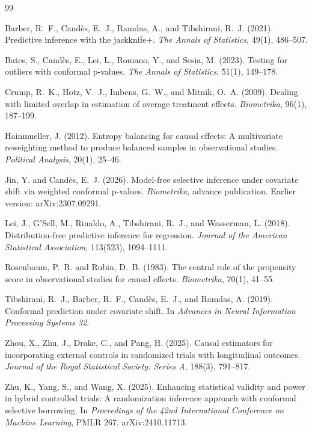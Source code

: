 \documentclass[11pt]{article}
\begin{document}
\newpage

\begin{thebibliography}{99}

Barber, R.~F., Cand\`es, E.~J., Ramdas, A., and Tibshirani, R.~J. (2021).
Predictive inference with the jackknife+.
\emph{The Annals of Statistics}, 49(1), 486--507.

Bates, S., Cand\`es, E., Lei, L., Romano, Y., and Sesia, M. (2023).
Testing for outliers with conformal p-values.
\emph{The Annals of Statistics}, 51(1), 149--178.

Crump, R.~K., Hotz, V.~J., Imbens, G.~W., and Mitnik, O.~A. (2009).
Dealing with limited overlap in estimation of average treatment effects.
\emph{Biometrika}, 96(1), 187--199.

Hainmueller, J. (2012).
Entropy balancing for causal effects: A multivariate reweighting method to produce balanced samples in observational studies.
\emph{Political Analysis}, 20(1), 25--46.

Jin, Y. and Cand\`es, E.~J. (2026).
Model-free selective inference under covariate shift via weighted conformal p-values.
\emph{Biometrika}, advance publication. Earlier version: arXiv:2307.09291.

Lei, J., G'Sell, M., Rinaldo, A., Tibshirani, R.~J., and Wasserman, L. (2018).
Distribution-free predictive inference for regression.
\emph{Journal of the American Statistical Association}, 113(523), 1094--1111.

Rosenbaum, P.~R. and Rubin, D.~B. (1983).
The central role of the propensity score in observational studies for causal effects.
\emph{Biometrika}, 70(1), 41--55.

Tibshirani, R.~J., Barber, R.~F., Cand\`es, E.~J., and Ramdas, A. (2019).
Conformal prediction under covariate shift.
In \emph{Advances in Neural Information Processing Systems 32}.

Zhou, X., Zhu, J., Drake, C., and Pang, H. (2025).
Causal estimators for incorporating external controls in randomized trials with longitudinal outcomes.
\emph{Journal of the Royal Statistical Society: Series A}, 188(3), 791--817.

Zhu, K., Yang, S., and Wang, X. (2025).
Enhancing statistical validity and power in hybrid controlled trials: A randomization inference approach with conformal selective borrowing.
In \emph{Proceedings of the 42nd International Conference on Machine Learning}, PMLR 267. arXiv:2410.11713.

\end{thebibliography}
\end{document}
